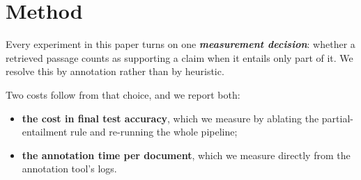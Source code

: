 \section{Method}
Every experiment in this paper turns on one \textbf{\emph{measurement decision}}:
whether a retrieved passage counts as supporting a claim when it entails only
part of it. We resolve this by annotation rather than by heuristic.

Two costs follow from that choice, and we report both:
\begin{itemize}
\item \textbf{the cost in final test accuracy}, which we measure by ablating the
partial-entailment rule and re-running the whole pipeline;
\item \textbf{the annotation time per document}, which we measure directly from
the annotation tool's logs.
\end{itemize}
